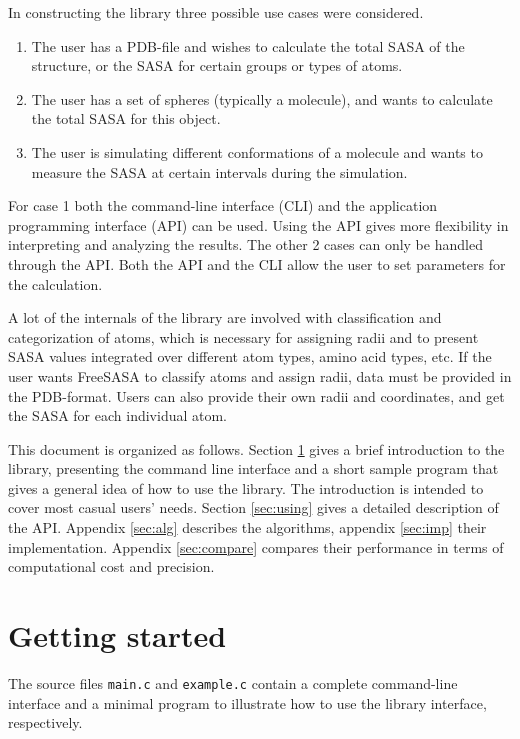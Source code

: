 \documentclass[a4paper,11pt]{article}
\begin{document}
In constructing the library three possible use cases were considered. 
\begin{enumerate}
\item The user has a PDB-file and wishes to calculate the total SASA of
  the structure, or the SASA for certain groups or types of atoms.
\item The user has a set of spheres (typically a molecule), and wants
  to calculate the total SASA for this object.
\item The user is simulating different conformations of a molecule and
  wants to measure the SASA at certain intervals during the simulation.
\end{enumerate}
For case 1 both the command-line interface (CLI) and the application
programming interface (API) can be used. Using the API gives more
flexibility in interpreting and analyzing the results. The other 2
cases can only be handled through the API. Both the API and the CLI
allow the user to set parameters for the calculation. 

A lot of the internals of the library are involved with classification
and categorization of atoms, which is necessary for assigning radii
and to present SASA values integrated over different atom types, amino
acid types, etc. If the user wants FreeSASA to classify atoms and
assign radii, data must be provided in the PDB-format. Users can also
provide their own radii and coordinates, and get the SASA for each
individual atom.

This document is organized as follows. Section \ref{sec:howto_short}
gives a brief introduction to the library, presenting the command line
interface and a short sample program that gives a general idea of how
to use the library. The introduction is intended to cover most casual
users' needs. Section \ref{sec:using} gives a detailed description of
the API. Appendix \ref{sec:alg} describes the algorithms, appendix
\ref{sec:imp} their implementation. Appendix \ref{sec:compare}
compares their performance in terms of computational cost and
precision.

\section{Getting started}\label{sec:howto_short}

The source files \verb|main.c| and \verb|example.c| contain
a complete command-line interface and a minimal program to illustrate
how to use the library interface, respectively. 
\end{document}
